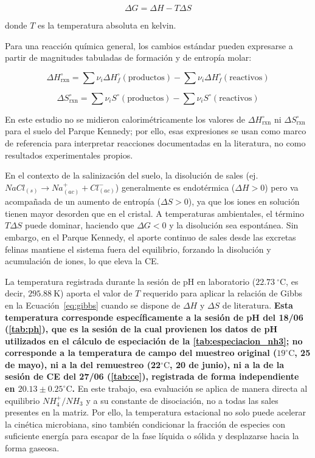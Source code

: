 \documentclass[fleqn]{jaes}
\begin{document}
\begin{equation}
\Delta G = \Delta H - T\Delta S
\label{eq:gibbs}
\end{equation}

donde $T$ es la temperatura absoluta en kelvin.

Para una reacción química general, los cambios estándar pueden expresarse a partir de magnitudes tabuladas de formación y de entropía molar:

\begin{equation}
\Delta H^\circ_{\mathrm{rxn}} = \sum \nu_i \Delta H_f^\circ(\text{productos}) - \sum \nu_i \Delta H_f^\circ(\text{reactivos})
\label{eq:delta_h_rxn}
\end{equation}

\begin{equation}
\Delta S^\circ_{\mathrm{rxn}} = \sum \nu_i S^\circ(\text{productos}) - \sum \nu_i S^\circ(\text{reactivos})
\label{eq:delta_s_rxn}
\end{equation}

En este estudio no se midieron calorimétricamente los valores de $\Delta H^\circ_{\mathrm{rxn}}$ ni $\Delta S^\circ_{\mathrm{rxn}}$ para el suelo del Parque Kennedy; por ello, esas expresiones se usan como marco de referencia para interpretar reacciones documentadas en la literatura, no como resultados experimentales propios.

En el contexto de la salinización del suelo, la disolución de sales (ej. $NaCl_{(s)} \rightarrow Na^+_{(ac)} + Cl^-_{(ac)}$) generalmente es endotérmica ($\Delta H > 0$) pero va acompañada de un aumento de entropía ($\Delta S > 0$), ya que los iones en solución tienen mayor desorden que en el cristal. A temperaturas ambientales, el término $T\Delta S$ puede dominar, haciendo que $\Delta G < 0$ y la disolución sea espontánea. Sin embargo, en el Parque Kennedy, el aporte continuo de sales desde las excretas felinas mantiene el sistema fuera del equilibrio, forzando la disolución y acumulación de iones, lo que eleva la CE.

La temperatura registrada durante la sesión de pH en laboratorio ($22.73~^\circ\text{C}$, es decir, $295.88~\text{K}$) aporta el valor de $T$ requerido para aplicar la relación de Gibbs en la Ecuación~\ref{eq:gibbs} cuando se dispone de $\Delta H$ y $\Delta S$ de literatura. \textbf{Esta temperatura corresponde específicamente a la sesión de pH del 18/06 (\cref{tab:ph}), que es la sesión de la cual provienen los datos de pH utilizados en el cálculo de especiación de la \cref{tab:especiacion_nh3}; no corresponde a la temperatura de campo del muestreo original ($19^\circ\text{C}$, 25 de mayo), ni a la del remuestreo (22$^\circ\text{C}$, 20 de junio), ni a la de la sesión de CE del 27/06 (\cref{tab:ce}), registrada de forma independiente en $20.13 \pm 0.25^\circ\text{C}$.} En este trabajo, esa evaluación se aplica de manera directa al equilibrio $NH_4^+/NH_3$ y a su constante de disociación, no a todas las sales presentes en la matriz. Por ello, la temperatura estacional no solo puede acelerar la cinética microbiana, sino también condicionar la fracción de especies con suficiente energía para escapar de la fase líquida o sólida y desplazarse hacia la forma gaseosa.
\end{document}

